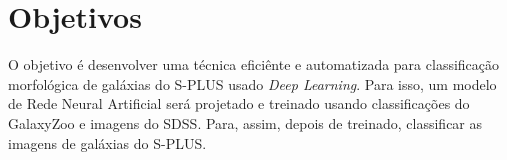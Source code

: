 \section*{Objetivos}

O objetivo é desenvolver uma técnica eficiênte e automatizada para classificação morfológica de galáxias do S-PLUS usado \emph{Deep Learning}. Para isso, um modelo de Rede Neural Artificial será projetado e treinado usando classificações do GalaxyZoo e imagens do SDSS. Para, assim, depois de treinado, classificar as imagens de galáxias do S-PLUS.